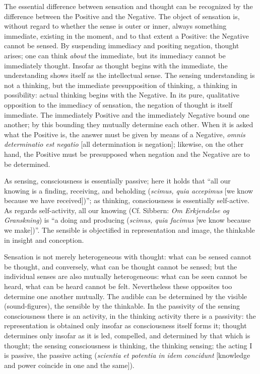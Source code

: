 \documentclass[12pt]{book}
\begin{document}
The essential difference between sensation and thought can be recognized by the
difference between the Positive and the Negative. The object of sensation is,
without regard to whether the sense is outer or inner, always something
immediate, existing in the moment, and to that extent a Positive: the Negative
cannot be sensed. By suspending immediacy and positing negation, thought arises;
one can think \emph{about} the immediate, but its immediacy cannot be immediately
thought. Insofar as thought begins with the immediate, the understanding shows
itself as the intellectual sense. The sensing understanding is not a thinking,
but the immediate presupposition of thinking, a thinking in possibility: actual
thinking begins with the Negative.
In its pure, qualitative opposition to the immediacy of sensation, the negation
of thought is itself immediate. The immediately Positive and the immediately
Negative bound one another; by this bounding they mutually determine each other.
When it is asked what the Positive is, the answer must be given by means of a
Negative, \textit{omnis determinatio est negatio} [all determination is
negation]; likewise, on the other hand, the Positive must be presupposed when
negation and the Negative are to be determined.

As sensing, consciousness is essentially passive; here it holds that ``all our
knowing is a finding, receiving, and beholding (\textit{scimus, quia accepimus}
[we know because we have received])''; as thinking, consciousness is essentially
self-active. As regards self-activity, all our knowing (Cf. Sibbern:
\emph{Om Erkjendelse og Granskning}) is ``a doing and producing (\textit{scimus,
quia facimus} [we know because we make])''. The sensible is objectified in
representation and image, the thinkable in insight and conception.

Sensation is not merely heterogeneous with thought: what can be sensed cannot be
thought, and conversely, what can be thought cannot be sensed; but the
individual senses are also mutually heterogeneous: what can be seen cannot be
heard, what can be heard cannot be felt. Nevertheless these opposites too
determine one another mutually. The audible can be determined by the visible
(sound-figures), the sensible by the thinkable. In the passivity of the sensing
consciousness there is an activity, in the thinking activity there is a
passivity: the representation is obtained only insofar as consciousness itself
forms it; thought determines only insofar as it is led, compelled, and
determined by that which is thought; the sensing consciousness is thinking, the
thinking sensing; the acting I is passive, the passive acting (\textit{scientia
et potentia in idem concidunt} [knowledge and power coincide in one and the
same]).
\end{document}
